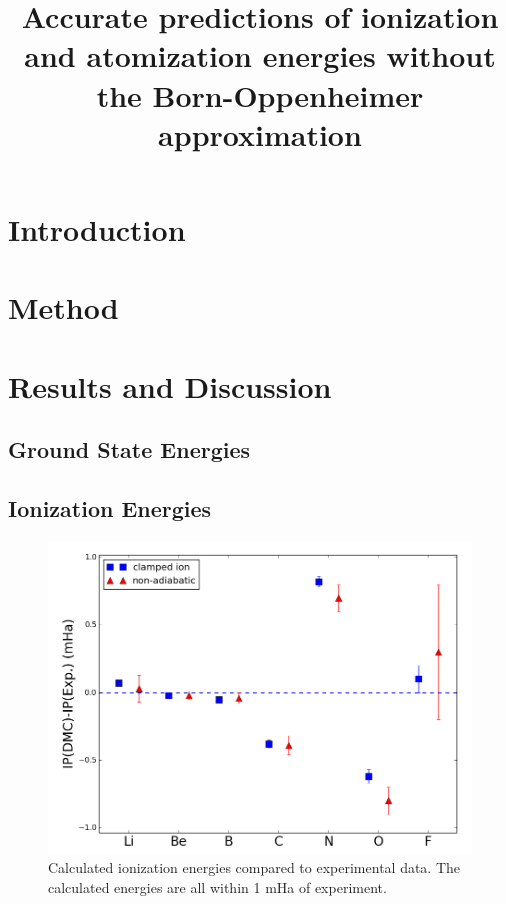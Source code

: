 \documentclass[pra,superscriptaddress,groupedaddress,twocolumn]{revtex4}
\begin{document}
\title{Accurate predictions of ionization and atomization energies without the Born-Oppenheimer approximation}


\maketitle

\section{Introduction}


\section{Method}


\section{Results and Discussion}


\subsection{Ground State Energies}


\subsection{Ionization Energies}

\begin{figure}[h]
\centering
\includegraphics[scale=.4]{Figures/ionization}
\caption{Calculated ionization energies compared to experimental data. The calculated energies are all within 1 mHa of experiment.}
\end{figure}
\end{document}
